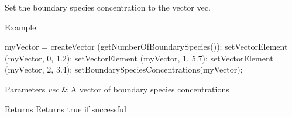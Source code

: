 \-Set the boundary species concentration to the vector vec. 

\-Example\-:


\begin{DoxyCode}
 myVector = createVector (getNumberOfBoundarySpecies());
 setVectorElement (myVector, 0, 1.2);
 setVectorElement (myVector, 1, 5.7);
 setVectorElement (myVector, 2, 3.4);
 setBoundarySpeciesConcentrations(myVector);
\end{DoxyCode}



\begin{DoxyParams}{\-Parameters}
{\em vec} & \-A vector of boundary species concentrations \\
\hline
\end{DoxyParams}
\begin{DoxyReturn}{\-Returns}
\-Returns true if successful 
\end{DoxyReturn}
